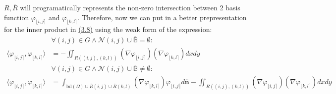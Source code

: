 \documentclass[]{article}
\begin{document}
    $R, \overline{R}$ will programatically represents the non-zero intersection between 2 basis function $\varphi_{\lfloor i,j \rceil}$ and $\varphi_{\lfloor k, l \rceil}$. Therefore, now we can put in a better prepresentation for the inner product in \hyperref[eqn:3.8]{(3.8)} using the weak form of the expression: 
    \begin{align*}\tag{3.10}\label{eqn:3.10}
        & \forall (i, j)\in G \wedge \mathcal{N}(i, j)\cup \overline{\mathbb{B}} = \emptyset: 
        \\
        \langle \varphi_{\lfloor i, j\rceil},\varphi_{\lfloor k, l\rceil}
        \rangle &=
        -\iint_{R((i, j), (k, l))} (\nabla \varphi_{\lfloor i,j \rceil})(\nabla \varphi_{\lfloor k, l\rceil})dxdy
        \\
        & \forall (i, j)\in G \wedge \mathcal{N}(i, j)\cup \overline{\mathbb{B}} \neq \emptyset: 
        \\
        \langle \varphi_{\lfloor i, j\rceil},\varphi_{\lfloor k, l\rceil}
        \rangle &=
        \int_{\text{bd}(\Omega)\cup \overline{R}(i, j)\cup \overline{R}(k, l)}
        (\nabla \varphi_{\lfloor k, l\rceil})\varphi_{\lfloor i, j\rceil}d
        \hat{\mathbf{n}}
        -\iint_{R((i, j), (k, l))} (\nabla \varphi_{\lfloor i,j \rceil})(\nabla \varphi_{\lfloor k, l\rceil})dxdy
    \end{align*}

        
\end{document}

